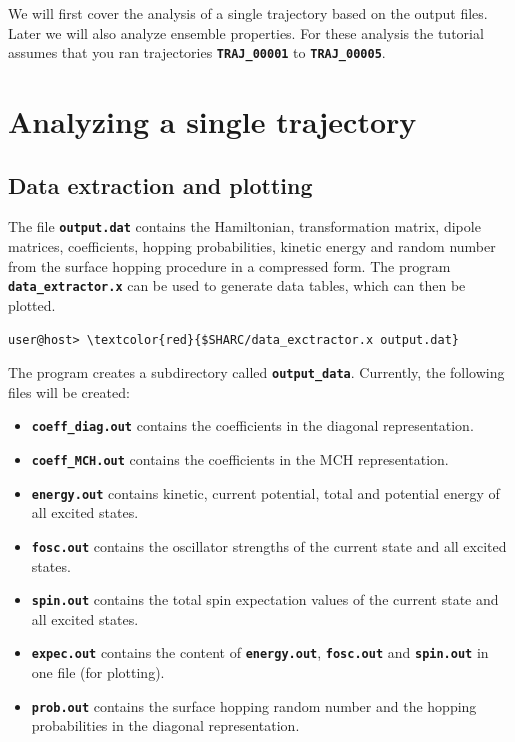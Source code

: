 \documentclass[a4paper,11pt,DIV=15,openany]{scrbook}
\newcommand{\ttt}[1]{\textbf{\texttt{#1}}}
\begin{document}


We will first cover the analysis of a single trajectory based on the output files. Later we will also analyze ensemble properties. For these analysis the tutorial assumes that you ran trajectories \ttt{TRAJ\_00001} to \ttt{TRAJ\_00005}.

\section{Analyzing a single trajectory}

\subsection{Data extraction and plotting}

The file \ttt{output.dat} contains the Hamiltonian, transformation matrix, dipole matrices, coefficients, hopping probabilities, kinetic energy and random number from the surface hopping procedure in a compressed form. The program \ttt{data\_extractor.x} can be used to generate data tables, which can then be plotted.
\begin{Verbatim}[commandchars=\\\{\}]
user@host> \textcolor{red}{$SHARC/data_exctractor.x output.dat}
\end{Verbatim}
The program creates a subdirectory called \ttt{output\_data}. Currently, the following files will be created:
\begin{itemize}
  \item \ttt{coeff\_diag.out} contains the coefficients in the diagonal representation.
  \item \ttt{coeff\_MCH.out} contains the coefficients in the MCH representation.
  \item \ttt{energy.out} contains kinetic, current potential, total and potential energy of all excited states.
  \item \ttt{fosc.out} contains the oscillator strengths of the current state and all excited states.
  \item \ttt{spin.out} contains the total spin expectation values of the current state and all excited states.
  \item \ttt{expec.out} contains the content of \ttt{energy.out}, \ttt{fosc.out} and \ttt{spin.out} in one file (for plotting).
  \item \ttt{prob.out} contains the surface hopping random number and the hopping probabilities in the diagonal representation.
\end{itemize}
\end{document}
